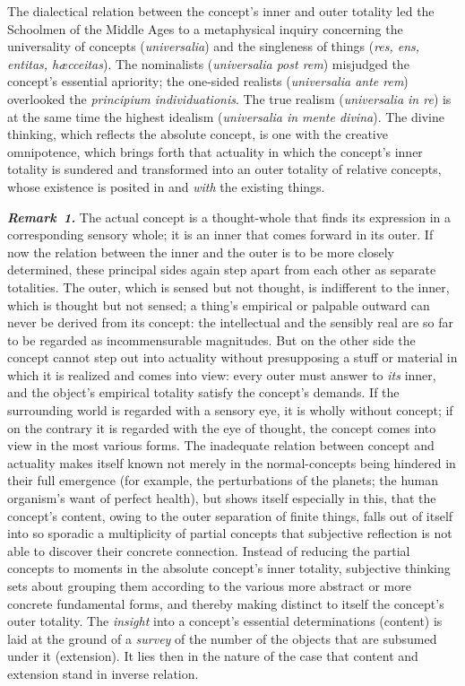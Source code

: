 \documentclass[12pt]{book}
\newcommand{\anm}[1]{\emph{\textbf{Remark~#1.}}}
\begin{document}
The dialectical relation between the concept's inner and outer totality led
the Schoolmen of the Middle Ages to a metaphysical inquiry concerning the
universality of concepts (\textit{universalia}) and the singleness of things
(\textit{res, ens, entitas, hæcceitas}). The nominalists
(\textit{universalia post rem}) misjudged the concept's essential apriority;
the one-sided realists (\textit{universalia ante rem}) overlooked the
\textit{principium individuationis}. The true realism (\textit{universalia
in re}) is at the same time the highest idealism (\textit{universalia in
mente divina}). The divine thinking, which reflects the absolute concept, is
one with the creative omnipotence, which brings forth that actuality in
which the concept's inner totality is sundered and transformed into an outer
totality of relative concepts, whose existence is posited in and \emph{with}
the existing things.

\anm{1} The actual concept is a thought-whole that finds its expression in a
corresponding sensory whole; it is an inner that comes forward in its outer.
If now the relation between the inner and the outer is to be more closely
determined, these principal sides again step apart from each other as
separate totalities. The outer, which is sensed but not thought, is
indifferent to the inner, which is thought but not sensed; a thing's
empirical or palpable outward can never be derived from its concept: the
intellectual and the sensibly real are so far to be regarded as
incommensurable magnitudes. But on the other side the concept cannot step
out into actuality without presupposing a stuff or material in which it is
realized and comes into view: every outer must answer to \emph{its} inner,
and the object's empirical totality satisfy the concept's demands. If the
surrounding world is regarded with a sensory eye, it is wholly without
concept; if on the contrary it is regarded with the eye of thought, the
concept comes into view in the most various forms. The inadequate relation
between concept and actuality makes itself known not merely in the
normal-concepts being hindered in their full emergence (for example, the
perturbations of the planets; the human organism's want of perfect health),
but shows itself especially in this, that the concept's content, owing to
the outer separation of finite things, falls out of itself into so sporadic
a multiplicity of partial concepts that subjective reflection is not able to
discover their concrete connection. Instead of reducing the partial concepts
to moments in the absolute concept's inner totality, subjective thinking
sets about grouping them according to the various more abstract or more
concrete fundamental forms, and thereby making distinct to itself the
concept's outer totality. The \emph{insight} into a concept's essential
determinations (content) is laid at the ground of a \emph{survey} of the
number of the objects that are subsumed under it (extension). It lies then
in the nature of the case that content and extension stand in inverse
relation.
\end{document}
